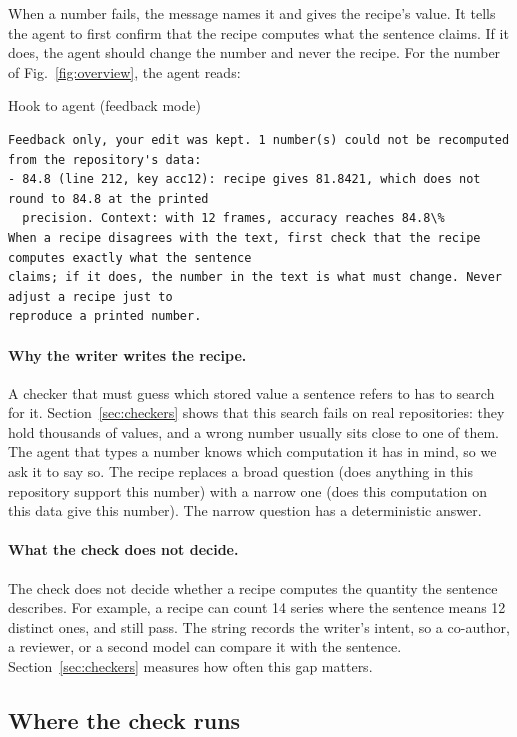 When a number fails, the message names it and gives the recipe's value. It tells the agent to first confirm that the
recipe computes what the sentence claims. If it does, the agent should change the number and never the recipe. For
the number of Fig.~\ref{fig:overview}, the agent reads:
\begin{card}[nwpurple]{Hook to agent (feedback mode)}
\begin{lstlisting}[style=plain]
Feedback only, your edit was kept. 1 number(s) could not be recomputed from the repository's data:
- 84.8 (line 212, key acc12): recipe gives 81.8421, which does not round to 84.8 at the printed
  precision. Context: with 12 frames, accuracy reaches 84.8\%
When a recipe disagrees with the text, first check that the recipe computes exactly what the sentence
claims; if it does, the number in the text is what must change. Never adjust a recipe just to
reproduce a printed number.
\end{lstlisting}
\end{card}

\paragraph{Why the writer writes the recipe.}
A checker that must guess which stored value a sentence refers to has to search for it. Section~\ref{sec:checkers}
shows that this search fails on real repositories: they hold thousands of values, and a wrong number usually sits
close to one of them. The agent that types a number knows which computation it has in mind, so we ask it to say so.
The recipe replaces a broad question (does anything in this repository support this number) with a narrow one (does
this computation on this data give this number). The narrow question has a deterministic answer.

\paragraph{What the check does not decide.}
The check does not decide whether a recipe computes the quantity the sentence describes. For example, a recipe can
count 14 series where the sentence means 12 distinct ones, and still pass. The  string records the
writer's intent, so a co-author, a reviewer, or a second model can compare it with the sentence.
Section~\ref{sec:checkers} measures how often this gap matters.

\subsection{Where the check runs}
\label{sec:placement}

